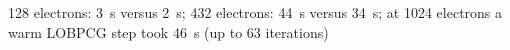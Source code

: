 128 electrons: 3~s versus 2~s; 432 electrons: 44~s versus 34~s; at 1024 electrons a warm LOBPCG step took 46~s (up to 63 iterations)
